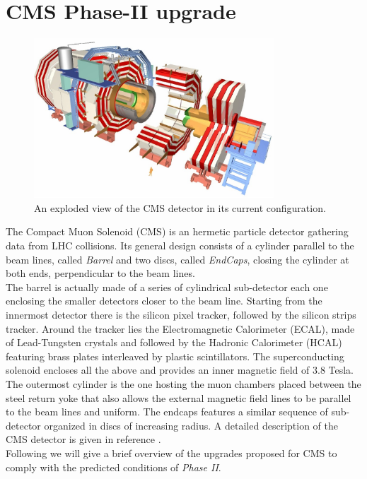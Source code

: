 \section{CMS Phase-II upgrade}
\begin{figure}
\centerline{\includegraphics[width=0.8\textwidth]{intro/cms.jpg}}
\caption{An exploded view of the CMS detector in its current configuration.}
\label{cms}
\end{figure}

The Compact Muon Solenoid (CMS) is an hermetic particle detector gathering data from LHC collisions. Its general design consists of a cylinder parallel to the beam lines, called \textit{Barrel} and two discs, called \textit{EndCaps}, closing the cylinder at both ends, perpendicular to the beam lines.\\
The barrel is actually made of a series of cylindrical sub-detector each one enclosing the smaller detectors closer to the beam line. Starting from the innermost detector there is the silicon pixel tracker, followed by the silicon strips tracker. Around the tracker lies the Electromagnetic Calorimeter (ECAL), made of Lead-Tungsten crystals and followed by the Hadronic Calorimeter (HCAL) featuring brass plates interleaved by plastic scintillators. The superconducting solenoid encloses all the above and provides an inner magnetic field of 3.8 Tesla. The outermost cylinder is the one hosting the muon chambers placed between the steel return yoke that also allows the external magnetic field lines to be parallel to the beam lines and uniform. The endcaps features a similar sequence of sub-detector organized in discs of increasing radius. A detailed description of the CMS detector is given in reference \cite{cms}.\\

Following we will give a brief overview of the upgrades proposed for CMS to comply with the predicted conditions of \textit{Phase II}.

